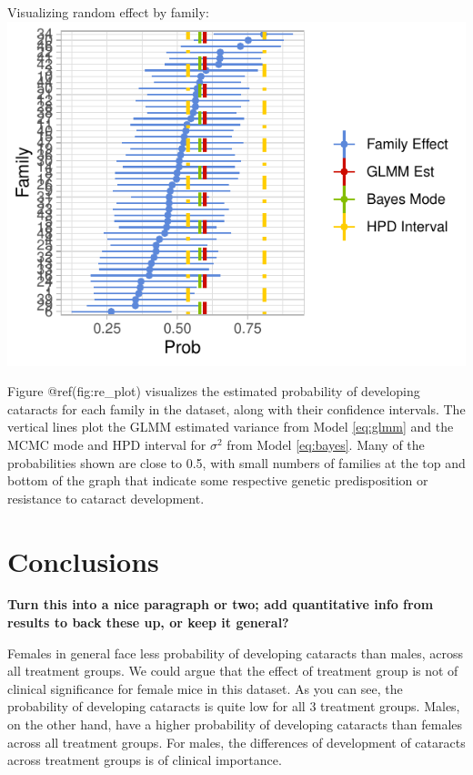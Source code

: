 \documentclass[12pt]{article}
\begin{document}
Visualizing random effect by family:\\
\includegraphics{bookdown_report_files/figure-latex/re_plot-1.pdf}

Figure @ref(fig:re\_plot) visualizes the estimated probability of developing cataracts for each family in the dataset, along with their confidence intervals. The vertical lines plot the GLMM estimated variance from Model \eqref{eq:glmm} and the MCMC mode and HPD interval for \(\sigma^2\) from Model \eqref{eq:bayes}. Many of the probabilities shown are close to 0.5, with small numbers of families at the top and bottom of the graph that indicate some respective genetic predisposition or resistance to cataract development.

\section{Conclusions}
\label{sec:conc}

\textbf{Turn this into a nice paragraph or two; add quantitative info from results to back these up, or keep it general?}

Females in general face less probability of developing cataracts than males, across all treatment groups. We could argue that the effect of treatment group is not of clinical significance for female mice in this dataset. As you can see, the probability of developing cataracts is quite low for all 3 treatment groups. Males, on the other hand, have a higher probability of developing cataracts than females across all treatment groups. For males, the differences of development of cataracts across treatment groups is of clinical importance.
\end{document}
